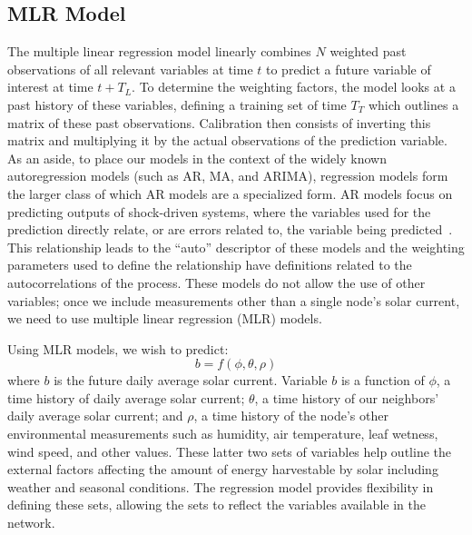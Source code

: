\documentclass[prodmode,acmtosn]{acmsmall}
\begin{document}
\subsection{MLR Model}
The multiple linear regression  model linearly combines $N$ weighted past observations of all relevant variables at time $t$ to predict a future variable of interest at time $t+T_L$.
To determine the weighting factors, the model looks at a past history of these variables, defining a training set of time $T_T$ which outlines a matrix of these past observations.
Calibration then consists of inverting this matrix and multiplying it by the actual observations of the prediction variable.
As an aside, to place our models in the context of the widely known autoregression models (such as AR, MA, and ARIMA), regression models form the larger class of which AR models are a specialized form.
AR models focus on predicting outputs of shock-driven systems, where the variables used for the prediction directly relate, or are errors related to, the variable being predicted~\cite{box1976}.
This relationship leads to the ``auto'' descriptor of these models and the weighting parameters used to define the relationship have definitions related to the autocorrelations of the process.
These models do not allow the use of other variables; once we include measurements other than a single node's solar current, we need to use multiple linear regression (MLR) models.

Using MLR models, we wish to predict:
\begin{equation}
  b=f(\phi,\theta,\rho)
\end{equation}
where $b$ is the future daily average solar current.
Variable $b$ is a function of $\phi$, a time history of daily average solar current; $\theta$, a time history of our neighbors' daily average solar current; and $\rho$, a time history of the node's other environmental measurements such as humidity, air temperature, leaf wetness, wind speed, and other values.
These latter two sets of variables help outline the external factors affecting the amount of energy harvestable by solar including weather and seasonal conditions.
The regression model provides flexibility in defining these sets, allowing the sets to reflect the variables available in the network.
\end{document}
